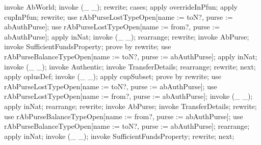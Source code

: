 \begin{LPScript}\begin{zproof}[lAbTransferOkayPREAbWorld]
    invoke AbWorld;
    invoke (\_ \ffun \_);
    rewrite;
    cases;
        apply overrideInPfun;
        apply cupInPfun;
        rewrite;
        use rAbPurseLostTypeOpen[name := toN?, purse := abAuthPurse];
        use rAbPurseLostTypeOpen[name := from?, purse := abAuthPurse];
        apply inNat;
        invoke (\_ \ffun \_);
        rearrange;
        rewrite;
        invoke AbPurse;
        invoke SufficientFundsProperty;
        prove by rewrite;
        use rAbPurseBalanceTypeOpen[name := toN?, purse := abAuthPurse];
        apply inNat;
        invoke (\_ \ffun \_);
        invoke Authentic;
        invoke TransferDetails;
        rearrange;
        rewrite;
    next;
        apply oplusDef;
        invoke (\_ \rel \_);
        apply cupSubset;
        prove by rewrite;
        use rAbPurseLostTypeOpen[name := toN?, purse := abAuthPurse];
        use rAbPurseLostTypeOpen[name := from?, purse := abAuthPurse];
        invoke (\_ \ffun \_);
        apply inNat;
        rearrange;
        rewrite;
        invoke AbPurse;
        invoke TransferDetails;
        rewrite;
        use rAbPurseBalanceTypeOpen[name := from?, purse := abAuthPurse];
        use rAbPurseBalanceTypeOpen[name := toN?, purse := abAuthPurse];
        rearrange;
        apply inNat;
        invoke (\_ \ffun \_);
        invoke SufficientFundsProperty;
        rewrite;
    next;
\end{zproof}\end{LPScript}



